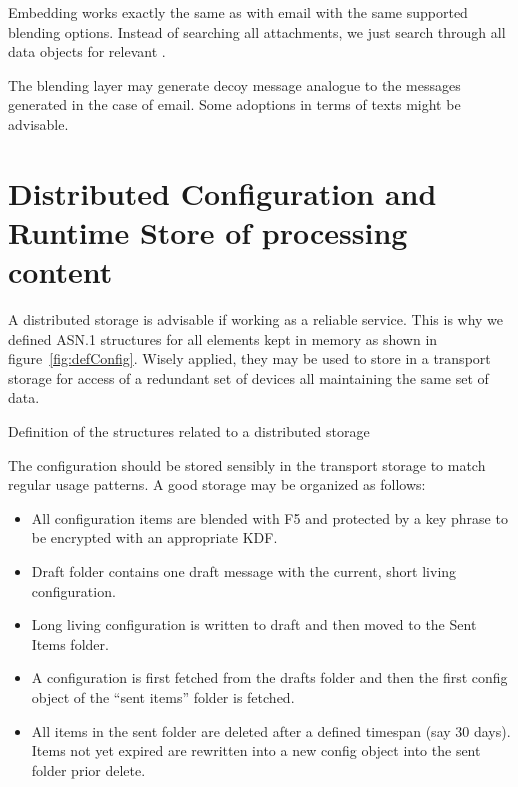 Embedding works exactly the same as with email with the same supported blending options. Instead of searching all attachments, we just search through all data objects for relevant \VortexMessages.

The blending layer may generate decoy message analogue to the messages generated in the case of email. Some adoptions in terms of texts might be advisable.

\section{Distributed Configuration and Runtime Store of processing content}
A distributed storage is advisable if working as a reliable service. This is why we defined ASN.1 structures for all elements kept in memory as shown in figure~\ref{fig:defConfig}. Wisely applied, they may be used to store in a transport storage for access of a redundant set of devices all maintaining the same set of data. 

\begin{lstfloat}[ht]
	
	\caption{Definition of the structures related to a distributed storage}
	\label{fig:defConfig}
\end{lstfloat}


The configuration should be stored sensibly in the transport storage to match regular usage patterns. A good storage may be organized as follows:
\begin{itemize}
	\item All configuration items are blended with F5 and protected by a key phrase to be encrypted with an appropriate KDF.
	\item Draft folder contains one draft message with the current, short living configuration. 
	\item Long living configuration is written to draft and then moved to the Sent Items folder.
	\item A configuration is first fetched from the drafts folder and then the first config object of the ``sent items'' folder is fetched.
	\item All items in the sent folder are deleted after a defined timespan (say 30 days). Items not yet expired are rewritten into a new config object into the sent folder prior delete. 
\end{itemize}


